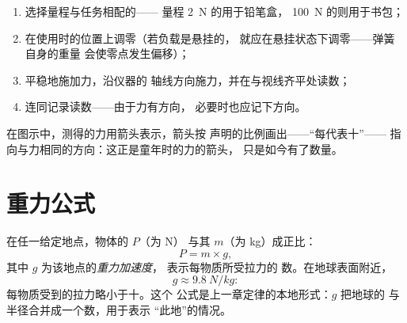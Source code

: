 \begin{method}[测量力]\label{met:g9:weight-vs-mass:measure}
\begin{enumerate}
  \item 选择量程与任务相配的——
        量程 \qty{2}{N} 的用于铅笔盒，
        \qty{100}{N} 的则用于书包；
  \item 在使用时的位置上调零（若负载是悬挂的，
        就应在悬挂状态下调零——弹簧自身的重量
        会使零点发生偏移）；
  \item 平稳地施加力，沿仪器的
        轴线方向施力，并在与视线齐平处读数；
  \item 连同记录读数——由于力有方向，
        必要时也应记下方向。
\end{enumerate}
在图示中，测得的力用箭头表示，箭头按
声明的比例画出——“每代表十”——
指向与力相同的方向：这正是童年时的力的箭头，
只是如今有了数量。
\end{method}

\section{重力公式}

\begin{proposition}[重力与质量成正比]\label{prop:g9:weight-vs-mass:formula}
在任一给定地点，物体的 $P$（为 \unit{N}）
与其 $m$（为 \unit{kg}）成正比：
\[
P = m \times g ,
\]
其中 $g$ 为该地点的\emph{重力加速度}，
表示每物质所受拉力的
数。在地球表面附近，
\[
g \approx \qty{9.8}{N/kg}:
\]
每物质受到的拉力略小于十。这个
公式是上一章定律的本地形式：$g$ 把地球的
与半径合并成一个数，用于表示
“此地”的情况。
\end{proposition}

